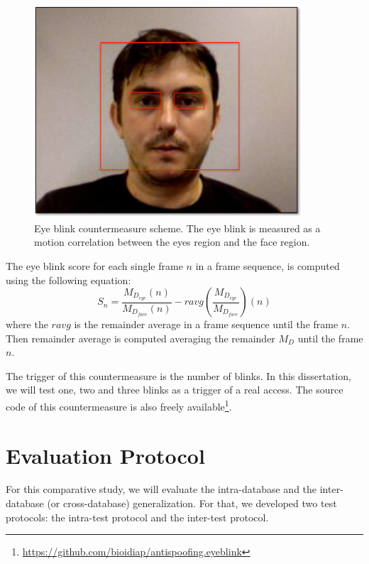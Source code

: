 \begin{figure}[!btb]
\begin{center}
\includegraphics [width=10cm] {images/eye_blink.pdf}
\caption[Eye blink countermeasure scheme]{Eye blink countermeasure scheme. The eye blink is measured as a motion correlation between the eyes region and the face region.}
\label{fig:eye_blink}
\end{center}
\end{figure}


The eye blink score for each single frame $n$ in a frame sequence, is computed using the following equation:
\begin{equation}
S_n=   \frac{M_{D_{eye}}(n)}{M_{D_{face}}(n)} - ravg(\frac{M_{D_{eye}}}{M_{D_{face}}})(n)
\label{eq:score_blink}
\end{equation}
where the $ravg$ is the remainder average in a frame sequence until the frame $n$. Then remainder average is computed averaging the remainder $M_D$ until the frame $n$. 

The trigger of this countermeasure is the number of blinks. In this dissertation, we will test one, two and three blinks as a trigger of a real access. The source code of this countermeasure is also freely available\footnote{\url{https://github.com/bioidiap/antispoofing.eyeblink}}.


\section{Evaluation Protocol}
\label{sec:Evaluation_Protocol}

For this comparative study, we will evaluate the intra-database and the inter-database (or cross-database) generalization. For that, we developed two test protocols: the intra-test protocol and the inter-test protocol. 

